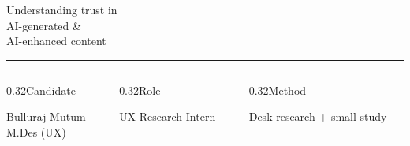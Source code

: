 \documentclass[aspectratio=169, 10pt]{beamer}
\newcommand{\metafont}{\fontsize{5.5pt}{7pt}\selectfont}
\newcommand{\meta}[1]{{\metafont #1}}
\newcommand{\bodysm}[1]{{\fontsize{8pt}{11pt}\selectfont\raggedright #1\par}}
\newcommand{\chromeL}{}
\newcommand{\chromeR}{}
\newcommand{\chromeLC}{hair}
\newcommand{\chromeorange}[2]{\gdef\chromeL{#1}\gdef\chromeR{#2}\gdef\chromeLC{ink}\leavevmode\par}
\begin{document}
{
\begin{frame}[plain, t]
  \chromeorange{UX Research\\Intern Challenge}{NOVEMBER 2026}

  \vspace*{0.85cm}
  {\fontsize{30pt}{31pt}\selectfont Understanding trust in\\AI-generated \&\\AI-enhanced content\par}

  \vfill
  {\color{ink}\rule{\linewidth}{0.4pt}}\par\vspace{0.12cm}
  \begin{columns}[T, onlytextwidth]
    \begin{column}{0.32\linewidth}\meta{\color{ink}Candidate}\\[0.05cm]\bodysm{Bulluraj Mutum\\[0.05cm]M.Des (UX)}\end{column}
    \begin{column}{0.32\linewidth}\meta{\color{ink}Role}\\[0.05cm]\bodysm{UX Research Intern}\end{column}
    \begin{column}{0.32\linewidth}\meta{\color{ink}Method}\\[0.05cm]\bodysm{Desk research + small study}\end{column}
  \end{columns}
  \vspace{0.75cm}
\end{frame}
}
\end{document}
